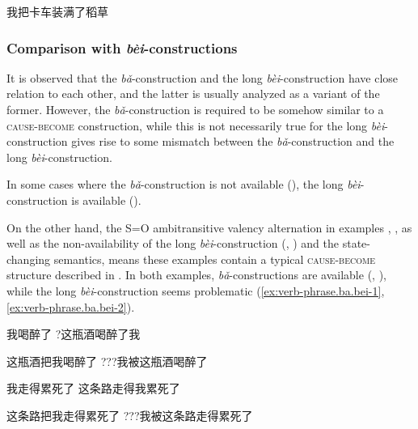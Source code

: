 \documentclass[UTF8, a4paper, oneside, scheme=plain, 12pt]{ctexrep}
\newcommand*{\citepage}[1]{p.~{#1}}
\newcommand{\form}[1]{\emph{#1}}
\newcommand*{\category}[1]{\textsc{#1}}
\begin{document}
\begin{exe}
    \ex 我把卡车装满了稻草 \citep[\citepage{153}]{huang2013}
\end{exe}

\subsubsection{Comparison with \form{bèi}-constructions}

It is observed that the \form{bǎ}-construction
and the long \form{bèi}-construction
have close relation to each other, 
and the latter is usually analyzed 
as a variant of the former.
However, the \form{bǎ}-construction
is required to be somehow similar to a \category{cause}-\category{become} construction,
while this is not necessarily true for the long \form{bèi}-construction
gives rise to some mismatch between the \form{bǎ}-construction
and the long \form{bèi}-construction.

In some cases where the \form{bǎ}-construction is not available 
(),
the long \form{bèi}-construction is available
().

On the other hand,
the S=O ambitransitive valency alternation 
in examples , ,
as well as the non-availability of the long \form{bèi}-construction
(, )
and the state-changing semantics,
means these examples contain a typical \category{cause}-\category{become} structure 
described in .
In both examples, 
\form{bǎ}-constructions are available 
(, ),
while the long \form{bèi}-construction 
seems problematic 
(\ref{ex:verb-phrase.ba.bei-1}, \ref{ex:verb-phrase.ba.bei-2}).

\begin{exe}
    \ex\label{ex:verb-phrase.ba.cause.1} \begin{xlist}
        \ex 我喝醉了
        \ex ?这瓶酒喝醉了我
    \end{xlist}
    \ex\label{ex:verb-phrase.ba.ba-1} 这瓶酒把我喝醉了
    \ex\label{ex:verb-phrase.ba.bei-1} ???我被这瓶酒喝醉了
\end{exe}

\begin{exe}
    \ex\label{ex:verb-phrase.ba.cause.2} \begin{xlist}
        \ex 我走得累死了
        \ex 这条路走得我累死了
    \end{xlist}
    \ex\label{ex:verb-phrase.ba.ba-2} 这条路把我走得累死了
    \ex\label{ex:verb-phrase.ba.bei-2} ???我被这条路走得累死了
\end{exe}
\end{document}

